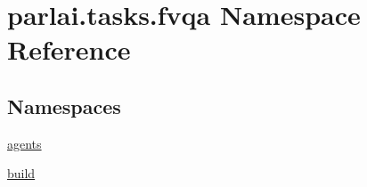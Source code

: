 \hypertarget{namespaceparlai_1_1tasks_1_1fvqa}{}\section{parlai.\+tasks.\+fvqa Namespace Reference}
\label{namespaceparlai_1_1tasks_1_1fvqa}
\subsection*{Namespaces}
\begin{DoxyCompactItemize}
\item 
 \hyperlink{namespaceparlai_1_1tasks_1_1fvqa_1_1agents}{agents}
\item 
 \hyperlink{namespaceparlai_1_1tasks_1_1fvqa_1_1build}{build}
\end{DoxyCompactItemize}
